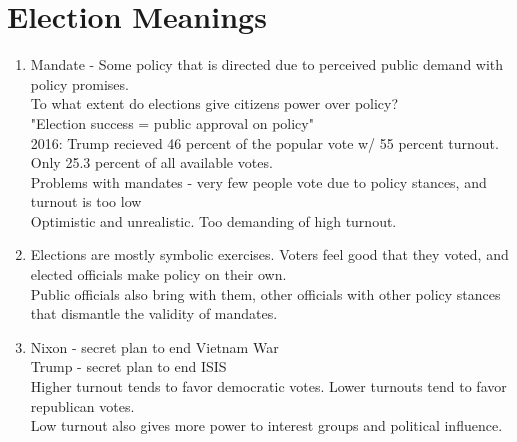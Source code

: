 \documentclass{article}
\begin{document}
\section{Election Meanings}
\begin{enumerate}
  \item {
  Mandate - Some policy that is directed due to perceived public demand with policy promises.\\
  To what extent do elections give citizens power over policy?\\
  "Election success = public approval on policy"\\
  2016: Trump recieved 46 percent of the popular vote w/ 55 percent turnout. Only 25.3 percent of all available votes.\\
  Problems with mandates - very few people vote due to policy stances, and turnout is too low\\
  Optimistic and unrealistic. Too demanding of high turnout.
  }
  \item {
  Elections are mostly symbolic exercises. Voters feel good that they voted, and elected officials make policy on their own.\\
  Public officials also bring with them, other officials with other policy stances that dismantle the validity of mandates.\\
  }
  \item {
  Nixon - secret plan to end Vietnam War\\
  Trump - secret plan to end ISIS\\

  Higher turnout tends to favor democratic votes. Lower turnouts tend to favor republican votes.\\
  Low turnout also gives more power to interest groups and political influence.
  }
\end{enumerate}
\end{document}
